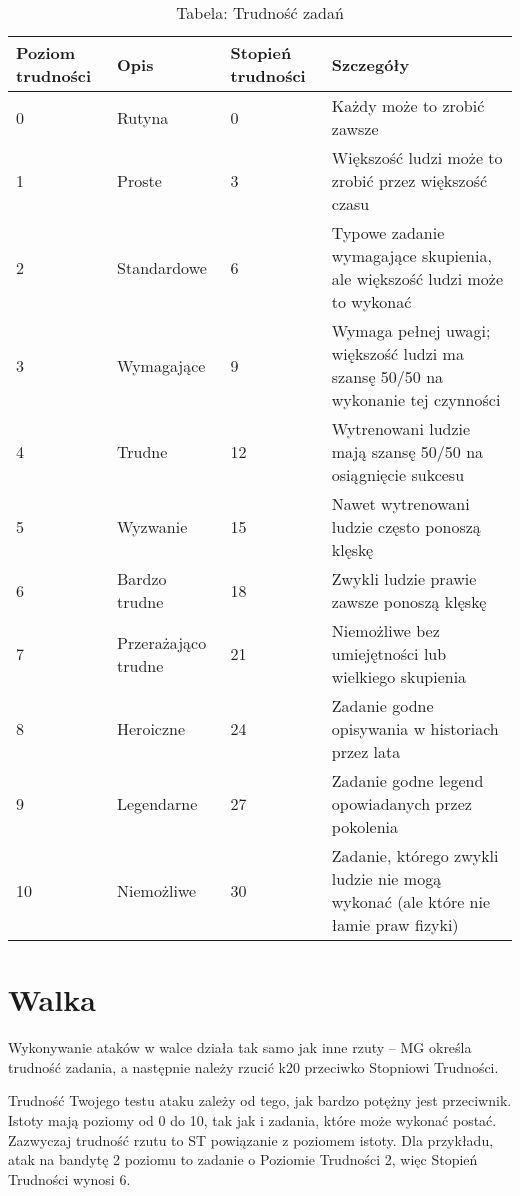 \begin{table*}[t]
 \centering
 \begin{tabularx}{\textwidth}{ | X | X | X | X |}
  \hline
   Poziom trudności & Opis & Stopień trudności & Szczegóły  \\ \hline
    0 & Rutyna & 0 & Każdy może to zrobić zawsze \\ \hline
    1 & Proste & 3 & Większość ludzi może to zrobić przez większość czasu  \\ \hline
    2 & Standardowe & 6 & Typowe zadanie wymagające skupienia, ale większość ludzi może to wykonać \\ \hline
    3 & Wymagające & 9 & Wymaga pełnej uwagi; większość ludzi ma szansę 50/50 na wykonanie tej czynności \\ \hline
    4 & Trudne & 12 & Wytrenowani ludzie mają szansę 50/50 na osiągnięcie sukcesu \\ \hline
    5 & Wyzwanie & 15 &Nawet wytrenowani ludzie często ponoszą klęskę \\ \hline
    6 & Bardzo trudne &18 &Zwykli ludzie prawie zawsze ponoszą klęskę \\ \hline
    7 & Przerażająco trudne & 21 &Niemożliwe bez umiejętności lub wielkiego skupienia \\ \hline
    8 & Heroiczne & 24 &Zadanie godne opisywania w historiach przez lata \\ \hline
    9 & Legendarne &27 &Zadanie godne legend opowiadanych przez pokolenia \\ \hline
    10 & Niemożliwe & 30 & Zadanie, którego zwykli ludzie nie mogą wykonać (ale które nie łamie praw fizyki) \\ \hline
 \end{tabularx}
  \caption {Tabela: Trudność zadań}
  \label {Tabela: Trudność zadań}
 \end{table*}
 
\section {Walka}
Wykonywanie ataków w walce działa tak samo jak inne rzuty – MG określa trudność zadania, a następnie należy rzucić k20 przeciwko Stopniowi Trudności.

Trudność Twojego testu ataku zależy od tego, jak bardzo potężny jest przeciwnik. Istoty mają poziomy od 0 do 10, tak jak i zadania, które może wykonać postać. Zazwyczaj trudność rzutu to ST powiązanie z poziomem istoty. Dla przykładu, atak na bandytę 2 poziomu to zadanie o Poziomie Trudności 2, więc Stopień Trudności wynosi 6. 

